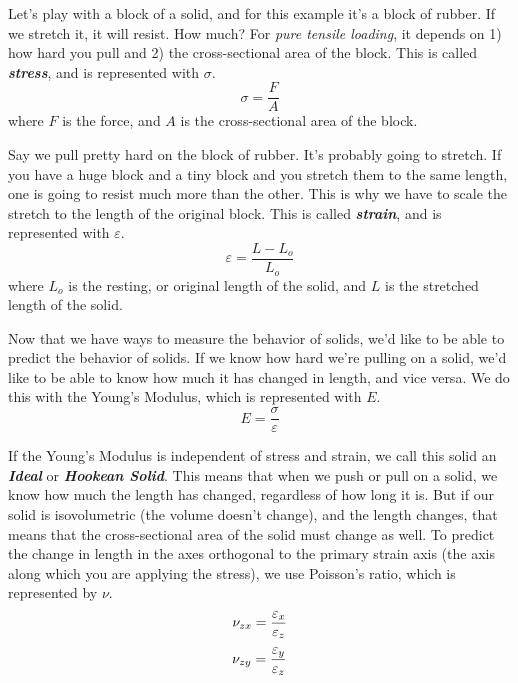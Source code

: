 Let's play with a block of a solid, and for this example it's a block of rubber. If we stretch it, it will resist. How much? For \emph{pure tensile loading}, it depends on 1) how hard you pull and 2) the cross-sectional area of the block. This is called \emph{\textbf{stress}}, and is represented with $\sigma$.
\begin{equation}
\sigma = \frac{F}{A}
\end{equation}
where $F$ is the force, and $A$ is the cross-sectional area of the block.

Say we pull pretty hard on the block of rubber. It's probably going to stretch. If you have a huge block and a tiny block and you stretch them to the same length, one is going to resist much more than the other. This is why we have to scale the stretch to the length of the original block. This is called \emph{\textbf{strain}}, and is represented with $\varepsilon$.
\begin{equation}
\varepsilon = \frac{L-L_o}{L_o}
\end{equation}
where $L_o$ is the resting, or original length of the solid, and $L$ is the stretched length of the solid.

Now that we have ways to measure the behavior of solids, we'd like to be able to predict the behavior of solids. If we know how hard we're pulling on a solid, we'd like to be able to know how much it has changed in length, and vice versa. We do this with the Young's Modulus, which is represented with $E$.
\begin{equation}
E = \frac{\sigma}{\varepsilon}
\end{equation}

If the Young's Modulus is independent of stress and strain, we call this solid an \emph{\textbf{Ideal}} or \emph{\textbf{Hookean Solid}}. This means that when we push or pull on a solid, we know how much the length has changed, regardless of how long it is. But if our solid is isovolumetric (the volume doesn't change), and the length changes, that means that the cross-sectional area of the solid must change as well. To predict the change in length in the axes orthogonal to the primary strain axis (the axis along which you are applying the stress), we use Poisson's ratio, which is represented by $\nu$. 
\begin{equation}
\nu_{zx} = \- \frac{\varepsilon_x}{\varepsilon_z}
\end{equation}
\begin{equation}
\nu_{zy} = \- \frac{\varepsilon_y}{\varepsilon_z}
\end{equation}

